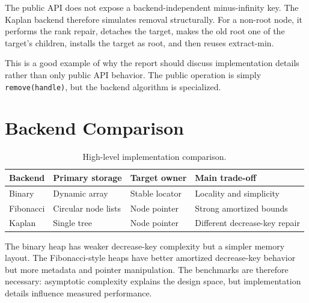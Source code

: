 The public API does not expose a backend-independent minus-infinity key.
The Kaplan backend therefore simulates removal structurally.
For a non-root node, it performs the rank repair, detaches the target, makes the old root one of the target's children, installs the target as root, and then reuses extract-min.

This is a good example of why the report should discuss implementation details rather than only public API behavior.
The public operation is simply \texttt{remove(handle)}, but the backend algorithm is specialized.

\section{Backend Comparison}

\begin{table}[H]
    \centering
    \begin{tabular}{llll}
        \toprule
        Backend   & Primary storage     & Target owner   & Main trade-off                \\
        \midrule
        Binary    & Dynamic array       & Stable locator & Locality and simplicity       \\
        Fibonacci & Circular node lists & Node pointer   & Strong amortized bounds       \\
        Kaplan    & Single tree         & Node pointer   & Different decrease-key repair \\
        \bottomrule
    \end{tabular}
    \caption{High-level implementation comparison.}
    \label{tab:backend-comparison}
\end{table}

The binary heap has weaker decrease-key complexity but a simpler memory layout.
The Fibonacci-style heaps have better amortized decrease-key behavior but more metadata and pointer manipulation.
The benchmarks are therefore necessary: asymptotic complexity explains the design space, but implementation details influence measured performance.
